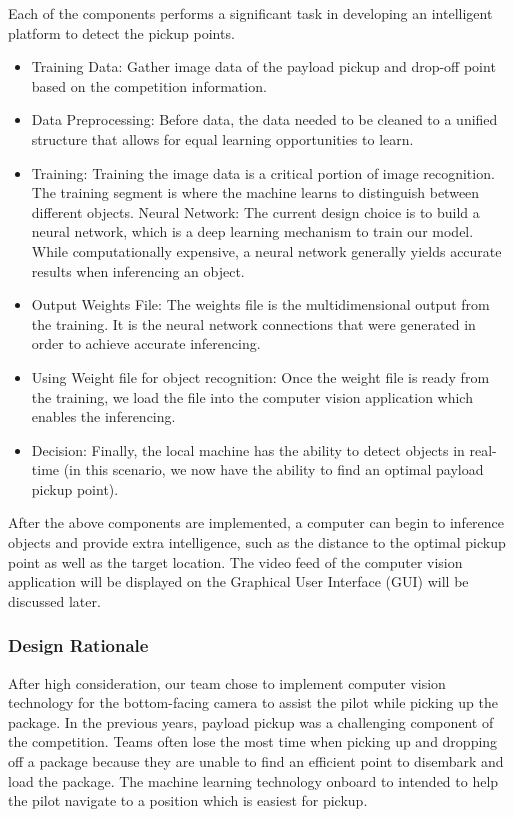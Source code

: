 \documentclass[onecolumn, oneside, letterpaper, draftclsnofoot, 10pt, compsoc]{IEEEtran}
\begin{document}
Each of the components performs a significant task in developing an intelligent platform to detect the pickup points.
\begin{itemize}
    \item Training Data: Gather image data of the payload pickup and drop-off point based on the competition information.
    \item Data Preprocessing: Before data, the data needed to be cleaned to a unified structure that allows for equal learning opportunities to learn.
    \item Training: Training the image data is a critical portion of image recognition. The training segment is where the machine learns to distinguish between different objects.
    \subitem Neural Network: The current design choice is to build a neural network, which is a deep learning mechanism to train our model. While computationally expensive, a neural network generally yields accurate results when inferencing an object.
    \item Output Weights File: The weights file is the multidimensional output from the training. It is the neural network connections that were generated in order to achieve accurate inferencing.
    \item Using Weight file for object recognition: Once the weight file is ready from the training, we load the file into the computer vision application which enables the inferencing.
    \item Decision: Finally, the local machine has the ability to detect objects in real-time (in this scenario, we now have the ability to find an optimal payload pickup point).
\end{itemize}

After the above components are implemented, a computer can begin to inference objects and provide extra intelligence, such as the distance to the optimal pickup point as well as the target location. The video feed of the computer vision application will be displayed on the Graphical User Interface (GUI) will be discussed later.

\subsubsection{Design Rationale}
After high consideration, our team chose to implement computer vision technology for the bottom-facing camera to assist the pilot while picking up the package. In the previous years, payload pickup was a challenging component of the competition. Teams often lose the most time when picking up and dropping off a package because they are unable to find an efficient point to disembark and load the package. The machine learning technology onboard to intended to help the pilot navigate to a position which is easiest for pickup.
\end{document}

